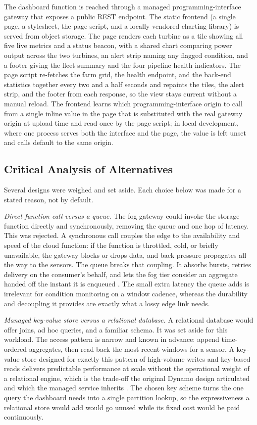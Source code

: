 \documentclass[conference]{IEEEtran}
\begin{document}
The dashboard function is reached through a managed programming-interface gateway that exposes a public REST endpoint. The static frontend (a single page, a stylesheet, the page script, and a locally vendored charting library) is served from object storage. The page renders each turbine as a tile showing all five live metrics and a status beacon, with a shared chart comparing power output across the two turbines, an alert strip naming any flagged condition, and a footer giving the fleet summary and the four pipeline health indicators. The page script re-fetches the farm grid, the health endpoint, and the back-end statistics together every two and a half seconds and repaints the tiles, the alert strip, and the footer from each response, so the view stays current without a manual reload. The frontend learns which programming-interface origin to call from a single inline value in the page that is substituted with the real gateway origin at upload time and read once by the page script; in local development, where one process serves both the interface and the page, the value is left unset and calls default to the same origin.

\subsection{Critical Analysis of Alternatives}

Several designs were weighed and set aside. Each choice below was made for a stated reason, not by default.

\textit{Direct function call versus a queue.} The fog gateway could invoke the storage function directly and synchronously, removing the queue and one hop of latency. This was rejected. A synchronous call couples the edge to the availability and speed of the cloud function: if the function is throttled, cold, or briefly unavailable, the gateway blocks or drops data, and back pressure propagates all the way to the sensors. The queue breaks that coupling. It absorbs bursts, retries delivery on the consumer's behalf, and lets the fog tier consider an aggregate handed off the instant it is enqueued \cite{hohpe2003}. The small extra latency the queue adds is irrelevant for condition monitoring on a window cadence, whereas the durability and decoupling it provides are exactly what a lossy edge link needs.

\textit{Managed key-value store versus a relational database.} A relational database would offer joins, ad hoc queries, and a familiar schema. It was set aside for this workload. The access pattern is narrow and known in advance: append time-ordered aggregates, then read back the most recent windows for a sensor. A key-value store designed for exactly this pattern of high-volume writes and key-based reads delivers predictable performance at scale without the operational weight of a relational engine, which is the trade-off the original Dynamo design articulated and which the managed service inherits \cite{decandia2007, elhemali2022}. The chosen key scheme turns the one query the dashboard needs into a single partition lookup, so the expressiveness a relational store would add would go unused while its fixed cost would be paid continuously.
\end{document}

